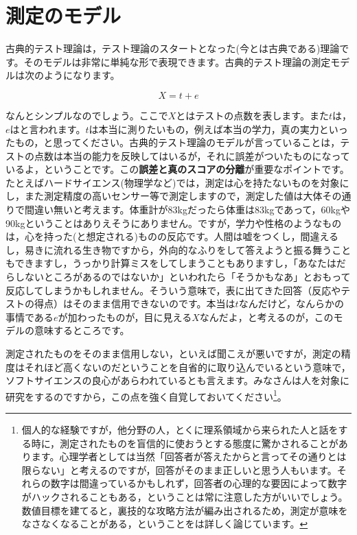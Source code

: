 \documentclass{ltjbook}
\begin{document}
\section{測定のモデル}
古典的テスト理論は，テスト理論のスタートとなった(今とは古典である)理論です。そのモデルは非常に単純な形で表現できます。古典的テスト理論の測定モデルは次のようになります。

\[ X = t + e \]

なんとシンプルなのでしょう。ここで$X$とはテストの点数を表します。また$t$は，$e$はと言われます。$t$は本当に測りたいもの，例えば本当の学力，真の実力といったもの，と思ってください。古典的テスト理論のモデルが言っていることは，テストの点数は本当の能力を反映してはいるが，それに誤差がついたものになっているよ，ということです。この\textbf{誤差と真のスコアの分離}が重要なポイントです。たとえばハードサイエンス(物理学など)では，測定は心を持たないものを対象にし，また測定精度の高いセンサー等で測定しますので，測定した値は大体その通りで間違い無いと考えます。体重計が83kgだったら体重は83kgであって，60kgや90kgということはありえそうにありません。ですが，学力や性格のようなものは，心を持った(と想定される)ものの反応です。人間は嘘をつくし，間違えるし，易きに流れる生き物ですから，外向的なふりをして答えようと振る舞うこともできますし，うっかり計算ミスをしてしまうこともありますし，「あなたはだらしないところがあるのではないか」といわれたら「そうかもなあ」とおもって反応してしまうかもしれません。そういう意味で，表に出てきた回答（反応やテストの得点）はそのまま信用できないのです。本当は$t$なんだけど，なんらかの事情である$e$が加わったものが，目に見える$X$なんだよ，と考えるのが，このモデルの意味するところです。

測定されたものをそのまま信用しない，といえば聞こえが悪いですが，測定の精度はそれほど高くないのだということを自省的に取り込んでいるという意味で，ソフトサイエンスの良心があらわれているとも言えます。みなさんは人を対象に研究をするのですから，この点を強く自覚しておいてください\footnote{個人的な経験ですが，他分野の人，とくに理系領域から来られた人と話をする時に，測定されたものを盲信的に使おうとする態度に驚かされることがあります。心理学者としては当然「回答者が答えたからと言ってその通りとは限らない」と考えるのですが，回答がそのまま正しいと思う人もいます。それらの数字は間違っているかもしれず，回答者の心理的な要因によって数字がハックされることもある，ということは常に注意した方がいいでしょう。数値目標を建てると，裏技的な攻略方法が編み出されるため，測定が意味をなさなくなることがある，ということを\citet{ジェリー2019}は詳しく論じています。}。
\end{document}
